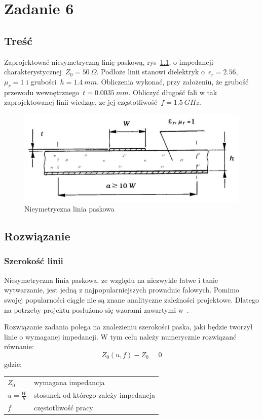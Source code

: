 \documentclass[rep.tex]{subfiles}
\begin{document}
\chapter{Zadanie 6}
\label{zad6}
\section{Treść}
Zaprojektować niesymetryczną linię paskową, rys~\ref{fig:zad6:microstrip}, o impedancji charakterystycznej~$Z_0 = 50~\Omega$.
Podłoże linii stanowi dielektryk o~$\epsilon_r = 2.56$, $\mu_r = 1$ i grubości~$h =  1.4~mm$.
Obliczenia wykonać, przy założeniu, że grubość przewodu wewnętrznego~$t =  0.0035~mm$.
Obliczyć długość fali w tak zaprojektowanej linii wiedząc, ze jej częstotliwość~$f = 1.5~GHz$.

\begin{figure}[!htbp]
  \centering
  \includegraphics[scale=0.5]{fig/zad6/microstrip}
  \caption{Nieymetryczna linia paskowa}
  \label{fig:zad6:microstrip}
\end{figure}

\section{Rozwiązanie}
\subsection{Szerokość linii}
Niesymetryczna linia paskowa, ze względu na niezwykle łatwe i tanie wytwarzanie, jest jedną z najpopularniejszych prowadnic falowych.
Pomimo swojej popularności ciągle nie są znane analityczne zależności projektowe.
Dlatego na potrzeby projektu posłużono się wzorami zawartymi w~\cite{obwody}.

Rozwiązanie zadania polega na znalezieniu szerokości paska, jaki będzie tworzył linie o wymaganej impedancji.
W tym celu należy numerycznie rozwiązanć równanie:
\begin{equation}
  Z_0(u, f) - Z_0 = 0 \label{eqn:zad6:target}
\end{equation}
gdzie:\\
\begin{tabular}{l @{ - } l}
  $Z_0$ & wymagana impedancja \\
  $u = \frac{W}{h}$ & stosunek od którego zależy impedancja \\
  $f$ & częstotliwość pracy
\end{tabular}
\end{document}
